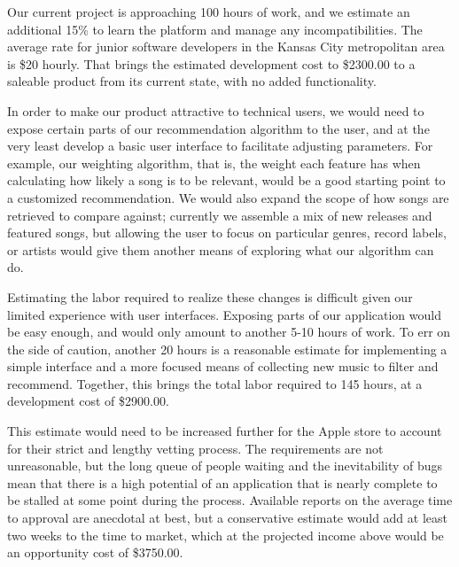 \documentclass{roffin}
\begin{document}
Our current project is approaching 100 hours of work, and we estimate an additional 15\% to learn the platform and manage any incompatibilities.  The average rate for junior software developers in the Kansas City metropolitan area is \$20 hourly.  That brings the estimated development cost to \$2300.00 to a saleable product from its current state, with no added functionality.

In order to make our product attractive to technical users, we would need to expose certain parts of our recommendation algorithm to the user, and at the very least develop a basic user interface to facilitate adjusting parameters.  For example, our weighting algorithm, that is, the weight each feature has when calculating how likely a song is to be relevant, would be a good starting point to a customized recommendation.  We would also expand the scope of how songs are retrieved to compare against;  currently we assemble a mix of new releases and featured songs, but allowing the user to focus on particular genres, record labels, or artists would give them another means of exploring what our algorithm can do.

Estimating the labor required to realize these changes is difficult given our limited experience with user interfaces.  Exposing parts of our application would be easy enough, and would only amount to another 5-10 hours of work.  To err on the side of caution, another 20 hours is a reasonable estimate for implementing a simple interface and a more focused means of collecting new music to filter and recommend.  Together, this brings the total labor required to 145 hours, at a development cost of \$2900.00.

This estimate would need to be increased further for the Apple store to account for their strict and lengthy vetting process.  The requirements are not unreasonable, but the long queue of people waiting and the inevitability of bugs mean that there is a high potential of an application that is nearly complete to be stalled at some point during the process.  Available reports on the average time to approval are anecdotal at best, but a conservative estimate would add at least two weeks to the time to market, which at the projected income above would be an opportunity cost of \$3750.00.
\end{document}
